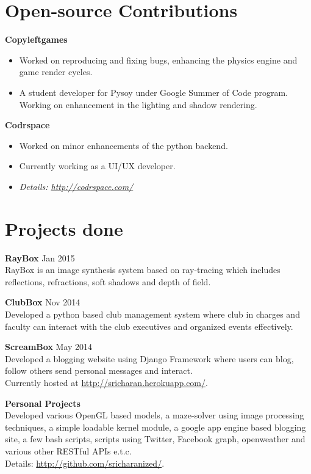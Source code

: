 \documentclass[margin]{res}
\begin{document}
\begin{resume}
\section{Open-source Contributions}
{\bf Copyleftgames} \begin{itemize} \item Worked on reproducing and fixing bugs, enhancing the physics engine and game render cycles. \item A student developer for Pysoy under Google Summer of Code program. Working on enhancement in the lighting and shadow rendering.
 \end{itemize}

{\bf Codrspace} \begin{itemize} \item Worked on minor enhancements of the python backend.\item Currently working as a UI/UX developer.  \item {\sl Details: \underline{http://codrspace.com/}} \end{itemize}


 \section{Projects done}
{\bf RayBox} \hfill Jan 2015 \\ RayBox is an image synthesis system based on ray-tracing which includes reflections, refractions, soft shadows and depth of field.

{\bf ClubBox} \hfill Nov 2014 \\ Developed a python based club management system where club in 
charges and faculty can interact with the club executives and organized events effectively.

{\bf ScreamBox} \hfill May 2014 \\ Developed a blogging website using Django Framework where users can blog, follow others send personal messages and interact.\\ Currently hosted at \underline{http://sricharan.herokuapp.com/}.

{\bf Personal Projects} \\ Developed various OpenGL based models, a maze-solver using image processing techniques, a simple loadable kernel module, a google app engine based blogging site, a few bash scripts, scripts using Twitter, Facebook graph, openweather and various other RESTful APIs e.t.c. \\Details: \underline{http://github.com/sricharanized/}.


\end{resume}
\end{document}
